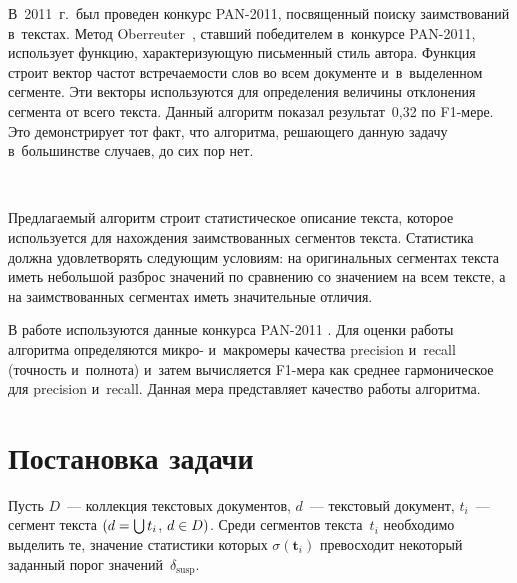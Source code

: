 \begin{multicols}{2}
В~2011~г.\ был 
проведен конкурс PAN-2011, посвященный поиску заимствований в~текстах. 
Метод 
Oberreuter~\cite{Chile}, ставший победителем в~конкурсе PAN-2011, использует 
функцию, характеризующую письменный стиль автора. Функция строит вектор час\-тот 
встречаемости слов во всем документе и~в~выделенном сегменте. Эти векторы 
используются для определения величины отклонения сегмента от всего текста. 
Данный алгоритм показал результат~0,32 по F1-ме\-ре. Это демонстрирует тот факт, 
что алгоритма, решающего данную задачу в~большинстве случаев, до сих пор нет.

\begin{figure*}[b] %
    \vspace*{-3pt}
\begin{center}
\mbox{%
\epsfxsize=164.328mm
}
\end{center}
\vspace*{-12pt}
\end{figure*}
    

Предлагаемый алгоритм строит статистическое описание текста, которое 
используется для на\-хож\-де\-ния заимствованных сегментов текста. Статистика должна 
удовлетворять следующим условиям: на оригинальных сегментах текста иметь 
небольшой разброс значений по сравнению со значением на всем тексте, а на 
заимствованных сегментах иметь значительные отличия.

В работе используются данные конкурса PAN-2011 \cite{PAN}. Для оценки работы 
алгоритма определяются микро- и~макромеры качества precision и~recall (точность 
и~полнота) и~затем вычисляется F1-мера как среднее гармоническое для precision 
и~recall.
Данная мера представляет качество работы алгоритма.

\vspace*{-4pt}

\section{Постановка задачи}

Пусть $D$~--- коллекция текстовых документов, $d$~--- текстовый документ, 
$t_i$~--- сегмент текста $(d \hm= \bigcup t_{i}$, $d \hm\in D)$. Среди сегментов 
текста~$t_i$ необходимо выделить те, значение статистики которых $\sigma 
(\mathbf{t}_i)$ превосходит некоторый заданный порог значений~$\delta_{\mathrm{susp}}$.

\vspace*{-8pt}


\end{multicols}
